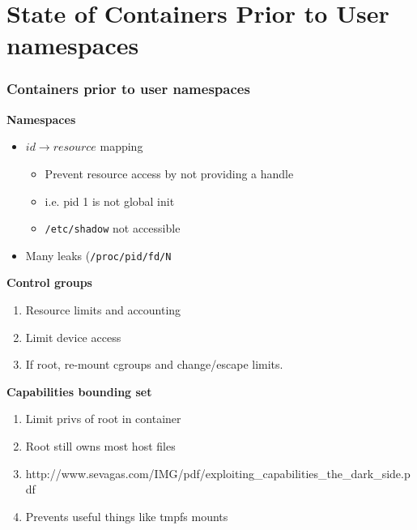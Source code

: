 \documentclass{beamer}
\begin{document}
\section{State of Containers Prior to User namespaces} %
\begin{frame}
\frametitle{Containers prior to user namespaces}
\textbf{Namespaces}
\begin{itemize}
\item $id \rightarrow resource$ mapping
	\begin{itemize}
	\item Prevent resource access by not providing a handle
	\item i.e. pid 1 is not global init
	\item {\tt /etc/shadow} not accessible
	\end{itemize}
\item Many leaks ({\tt /proc/pid/fd/N}
\end{itemize}

\textbf{Control groups}
\begin{enumerate}
\item Resource limits and accounting
\item Limit device access
\item If root, re-mount cgroups and change/escape limits.
\end{enumerate}

\vspace{.25in}

\textbf{Capabilities bounding set}
\begin{enumerate}
\item Limit privs of root in container
\item Root still owns most host files
\item {\tiny http://www.sevagas.com/IMG/pdf/exploiting\_capabilities\_the\_dark\_side.pdf}
\item Prevents useful things like tmpfs mounts
\end{enumerate}
\end{frame}
\end{document}
